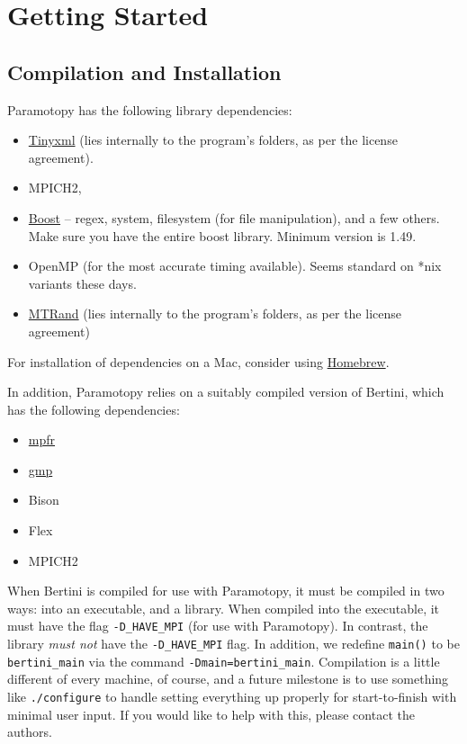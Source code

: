 \clearpage
\section{Getting Started}
\label{sec:started}

\subsection{Compilation and Installation}

Paramotopy has the following library dependencies: 
\begin{itemize}
\item \href{http://sourceforge.net/projects/tinyxml/}{Tinyxml}  (lies internally to the program's folders, as per the license agreement).
\item MPICH2,
\item  \href{http://www.boost.org/}{Boost} -- regex, system, filesystem (for file manipulation), and a few others.  Make sure you have the entire boost library.  Minimum version is 1.49.
\item OpenMP (for the most accurate timing available).  Seems standard on *nix variants these days.
\item \href{http://www.bedaux.net/mtrand/}{MTRand} (lies internally to the program's folders, as per the license agreement)
\end{itemize}
\noindent For installation of dependencies on a Mac, consider using \href{http://mxcl.github.io/homebrew/}{Homebrew}.
\vspace{10mm}

\noindent In addition, Paramotopy relies on a suitably compiled version of Bertini, which has the following dependencies:
\begin{itemize}
\item \href{http://www.mpfr.org/}{mpfr} 
\item \href{http://gmplib.org/}{gmp}
\item Bison
\item Flex
\item MPICH2
\end{itemize}


When Bertini is compiled for use with Paramotopy, it must be compiled in two ways:  into an executable, and a library.  When compiled into the executable, it must have the flag \texttt{-D\_HAVE\_MPI} (for use with Paramotopy).  In contrast, the library \emph{must not} have the \texttt{-D\_HAVE\_MPI} flag.  In addition, we redefine \texttt{main()} to be \texttt{bertini\_main} via the command \texttt{-Dmain=bertini\_main}.  Compilation is a little different of every machine, of course, and a future milestone is to use something like \texttt{./configure} to handle setting everything up properly for start-to-finish with minimal user input.  If you would like to help with this, please contact the authors.

